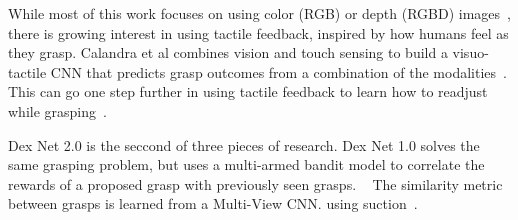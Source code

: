 While most of this work focuses on using color (RGB) or depth (RGBD) images~\cite{lenz2015deep}, there is growing interest in using tactile feedback, inspired by how humans feel as they grasp. 
Calandra et al combines vision and touch sensing to build a visuo-tactile CNN that predicts grasp outcomes from a combination of the modalities~\cite{calandra2017feeling}. 
This can go one step further in using tactile feedback to learn how to readjust while grasping~\cite{chebotar2016self}. 

Dex Net 2.0 is the seccond of three pieces of research. 
Dex Net 1.0 solves the same grasping problem, but uses a multi-armed bandit model to correlate the rewards of a proposed grasp with previously seen grasps. ~\cite{mahler2016dex}
The similarity metric between grasps is learned from a Multi-View CNN. using suction~\cite{mahler2017suction}. 

